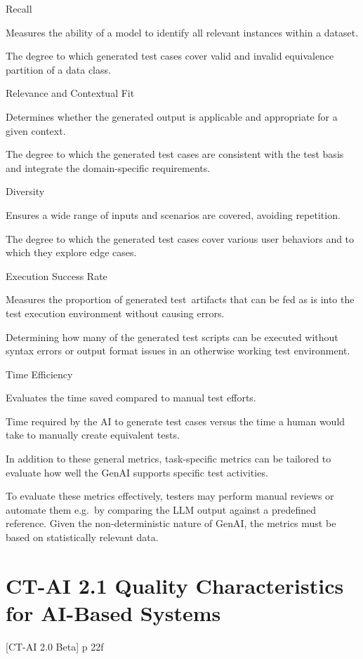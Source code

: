 \documentclass[
  letterpaper,
  DIV=11,
  numbers=noendperiod,
  oneside]{scrreprt}
\begin{document}
\begin{tcolorbox}
Recall

Measures the ability of a model to identify all relevant instances
within a dataset.

The degree to which generated test cases cover valid and invalid
equivalence partition of a data class.

Relevance and Contextual Fit

Determines whether the generated output is applicable and appropriate
for a given context.

The degree to which the generated test cases are consistent with the
test basis and integrate the domain-specific requirements.

Diversity

Ensures a wide range of inputs and scenarios are covered, avoiding
repetition.

The degree to which the generated test cases cover various user
behaviors and to which they explore edge cases.

Execution Success Rate

Measures the proportion of generated test~artifacts that can be fed as
is into the test execution environment without causing errors.~

Determining how many of the generated test scripts can be executed
without syntax errors or output format issues in an otherwise working
test environment.

Time Efficiency

Evaluates the time saved compared to manual test efforts.

Time required by the AI to generate test cases versus the time a human
would take to manually create equivalent tests.

In addition to these general metrics, task-specific metrics can be
tailored to evaluate how well the GenAI supports specific test
activities.

To evaluate these metrics effectively, testers may perform manual
reviews or automate them e.g.~by comparing the LLM output against a
predefined reference. Given the non-deterministic nature of GenAI, the
metrics must be based on statistically relevant data.

\chapter{CT-AI 2.1 Quality Characteristics for AI-Based
Systems}\label{ct-ai-2.1-quality-characteristics-for-ai-based-systems}

{[}CT-AI 2.0 Beta{]} p 22f


\end{tcolorbox}
\end{document}
